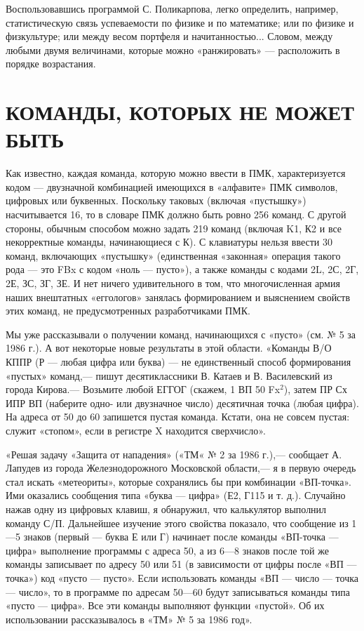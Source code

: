 \documentclass[11pt,a4paper,oneside]{article}
\begin{document}
Воспользовавшись программой С. Поликарпова, легко определить, например, статистическую связь успеваемости по физике и по математике; или по физике и физкультуре; или между весом портфеля и начитанностью... Словом, между любыми двумя величинами, которые можно «ранжировать» — расположить в порядке возрастания.

\section{КОМАНДЫ, КОТОРЫХ НЕ МОЖЕТ БЫТЬ}
Как известно, каждая команда, которую можно ввести в ПМК, характеризуется кодом — двузначной комбинацией имеющихся в «алфавите» ПМК символов, цифровых или буквенных. Поскольку таковых (включая «пустышку») насчитывается 16, то в словаре ПМК должно быть ровно 256 команд. С другой стороны, обычным способом можно задать 219 команд (включая K1, К2 и все некорректные команды, начинающиеся с К). С клавиатуры нельзя ввести 30 команд, включающих «пустышку» (единственная «законная» операция такого рода — это FBx с кодом «ноль — пусто»), а также команды с кодами 2L, 2С, 2Г, 2Е, ЗС, ЗГ, ЗЕ. И нет ничего удивительного в том, что многочисленная армия наших внештатных «еггологов» занялась формированием и выяснением свойств этих команд, не предусмотренных разработчиками ПМК.

Мы уже рассказывали о получении команд, начинающихся с «пусто» (см. № 5 за 1986 г.). А вот некоторые новые результаты в этой области.
«Команды В/О КППР (Р — любая цифра или буква) — не единственный способ формирования «пустых» команд,— пишут десятиклассники В. Катаев и В. Василевский из города Кирова.— Возьмите любой ЕГГОГ (скажем, 1 ВП 50 Fx$^{2}$), затем ПР Сх ИПР ВП (наберите одно- или двузначное число) десятичная точка (любая цифра). На адреса от 50 до 60 запишется пустая команда. Кстати, она не совсем пустая: служит «стопом», если в регистре X находится сверхчисло».

«Решая задачу «Защита от нападения» («ТМ« № 2 за 1986 г.),— сообщает А. Лапудев из города Железнодорожного Московской области,— я в первую очередь стал искать «метеориты», которые сохранялись бы при комбинации «ВП-точка». Ими оказались сообщения типа «буква — цифра» (Е2, Г115 и т. д.). Случайно нажав одну из цифровых клавиш, я обнаружил, что калькулятор выполнил команду С/П. Дальнейшее изучение этого свойства показало, что сообщение из 1—5 знаков (первый — буква Е или Г) начинает после команды «ВП-точка — цифра» выполнение программы с адреса 50, а из 6—8 знаков после той же команды записывает по адресу 50 или 51 (в зависимости от цифры после «ВП — точка») код «пусто — пусто». Если использовать команды «ВП — число — точка — число», то в программе по адресам 50—60 будут записываться команды типа «пусто — цифра». Все эти команды выполняют функции «пустой». Об их использовании рассказывалось в «ТМ» № 5 за 1986 год».
\end{document}
